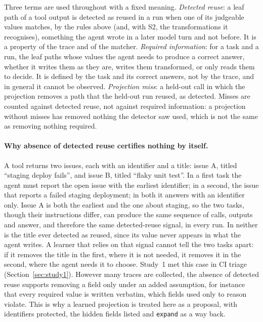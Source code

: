 Three terms are used throughout with a fixed meaning. \emph{Detected reuse}: a leaf path of a tool output is
detected as reused in a run when one of its judgeable values matches, by the rules above (and, with S2, the
transformations it recognises), something the agent wrote in a later model turn and not before. It is a property of
the trace and of the matcher. \emph{Required information}: for a task and a run, the leaf paths whose values the
agent needs to produce a correct answer, whether it writes them as they are, writes them transformed, or only reads
them to decide. It is defined by the task and its correct answers, not by the trace, and in general it cannot be
observed. \emph{Projection miss}: a held-out call in which the projection removes a path that the held-out run
reused, as detected. Misses are counted against detected reuse, not against required information: a projection
without misses has removed nothing the detector saw used, which is not the same as removing nothing required.

\paragraph{Why absence of detected reuse certifies nothing by itself.} A tool returns two issues, each with an
identifier and a title: issue A, titled ``staging deploy fails'', and issue B, titled ``flaky unit test''. In a first
task the agent must report the open issue with the earliest identifier; in a second, the issue that reports a failed
staging deployment; in both it answers with an identifier only. Issue A is both the earliest and the one about
staging, so the two tasks, though their instructions differ, can produce the same sequence of calls, outputs and answer,
and therefore the same detected-reuse signal, in every run. In neither is the title
ever detected as reused, since its value never appears in what the agent writes. A learner that relies on that signal cannot
tell the two tasks apart: if it removes the title in the first, where it is not needed, it removes it in the
second, where the agent needs it to choose. Study~1 met this case in CI triage (Section~\ref{sec:study1}). However
many traces are collected, the absence of detected reuse supports removing a field only under an added assumption,
for instance that every required value is written verbatim, which fields used only to reason violate. This is why a
learned projection is treated here as a proposal, with identifiers protected, the hidden fields listed and
\texttt{expand} as a way back.

